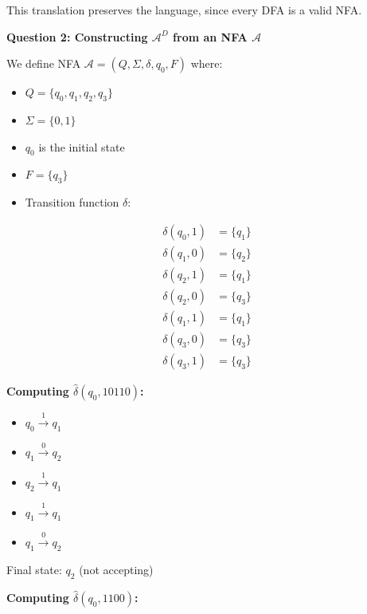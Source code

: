 \documentclass{article}
\theoremstyle{theorem}
\theoremstyle{definition}
\theoremstyle{remark}
\begin{document}
This translation preserves the language, since every DFA is a valid NFA.

\bigskip

\textbf{Question 2: Constructing $\mathcal{A}^D$ from an NFA $\mathcal{A}$}

We define NFA $\mathcal{A} = (Q, \Sigma, \delta, q_0, F)$ where:

\begin{itemize}
    \item $Q = \{q_0, q_1, q_2, q_3\}$
    \item $\Sigma = \{0, 1\}$
    \item $q_0$ is the initial state
    \item $F = \{q_3\}$
    \item Transition function $\delta$:
\end{itemize}

\begin{align*}
    \delta(q_0, 1) &= \{q_1\} \\
    \delta(q_1, 0) &= \{q_2\} \\
    \delta(q_2, 1) &= \{q_1\} \\
    \delta(q_2, 0) &= \{q_3\} \\
    \delta(q_1, 1) &= \{q_1\} \\
    \delta(q_3, 0) &= \{q_3\} \\
    \delta(q_3, 1) &= \{q_3\}
\end{align*}

\bigskip

\textbf{Computing $\hat{\delta}(q_0, 10110)$:}

\begin{itemize}
    \item $q_0 \xrightarrow{1} q_1$
    \item $q_1 \xrightarrow{0} q_2$
    \item $q_2 \xrightarrow{1} q_1$
    \item $q_1 \xrightarrow{1} q_1$
    \item $q_1 \xrightarrow{0} q_2$
\end{itemize}

Final state: $q_2$ (not accepting)

\bigskip

\textbf{Computing $\hat{\delta}(q_0, 1100)$:}
\end{document}
